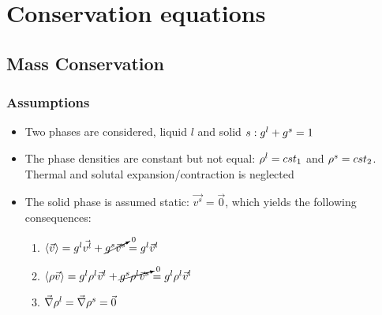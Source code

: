 \section{Conservation equations}

\subsection{Mass Conservation}
\subsubsection{Assumptions}
\begin{itemize}
\item Two phases are considered, liquid $l$ and solid $s: {g^l}+{g^s} =1 $ %
\item The phase densities are constant but not equal: $ \rho^l=cst_1 $ and $ \rho^s=cst_2 $. Thermal and solutal expansion/contraction
is neglected
\item The solid phase is assumed static: $\vec{v^s}=\vec{0}$, which yields the following consequences:
\begin{enumerate}
\item $ \langle \vec{v} \rangle= {g^l} \vec{v^l} + \cancelto{0}{{g^s} \vec{v}^s} = {g^l} \vec{v}^l $
\item $ \langle \rho \vec{v} \rangle = {g^l} \rho^l \vec{v}^l + \cancelto{0}{{g^s} \rho^l \vec{v}^s} = {g^l} \rho^l \vec{v}^l $
\item $\vec{\nabla} \rho^l = \vec{\nabla} \rho^s = \vec{0}$
\end{enumerate}
\end{itemize}
